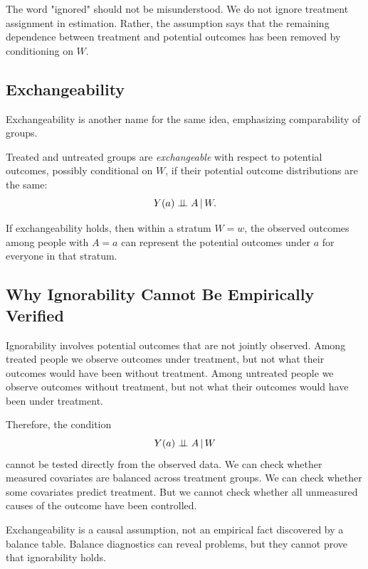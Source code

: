 The word "ignored" should not be misunderstood. We do not ignore treatment assignment in estimation. Rather, the assumption says that the remaining dependence between treatment and potential outcomes has been removed by conditioning on $W$.

\subsection{Exchangeability}

Exchangeability is another name for the same idea, emphasizing comparability of groups.

\begin{definition}[Exchangeability]
Treated and untreated groups are \emph{exchangeable} with respect to potential outcomes, possibly conditional on $W$, if their potential outcome distributions are the same:
\[
Y(a)\perp\!\!\!\perp A\,\vert\, W.
\]
\end{definition}

If exchangeability holds, then within a stratum $W=w$, the observed outcomes among people with $A=a$ can represent the potential outcomes under $a$ for everyone in that stratum.

\subsection{Why Ignorability Cannot Be Empirically Verified}

Ignorability involves potential outcomes that are not jointly observed. Among treated people we observe outcomes under treatment, but not what their outcomes would have been without treatment. Among untreated people we observe outcomes without treatment, but not what their outcomes would have been under treatment.

Therefore, the condition
\[
Y(a)\perp\!\!\!\perp A\,\vert\, W
\]
cannot be tested directly from the observed data. We can check whether measured covariates are balanced across treatment groups. We can check whether some covariates predict treatment. But we cannot check whether all unmeasured causes of the outcome have been controlled.

\begin{keyidea}
Exchangeability is a causal assumption, not an empirical fact discovered by a balance table. Balance diagnostics can reveal problems, but they cannot prove that ignorability holds.
\end{keyidea}
